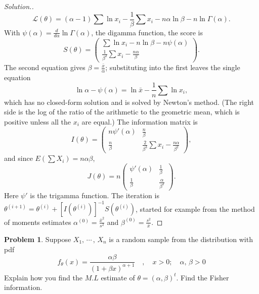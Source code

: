 \documentclass[12pt,a4paper]{report}
\theoremstyle{definition}
\newtheorem{problemx}{Problem}[section]
\newenvironment{problem}{\begin{problemx}}{\end{problemx}}
\newenvironment{solution}
  {\renewcommand{\qedsymbol}{}\begin{proof}[\textit{Solution}.]}
  {\end{proof}}
\begin{document}
\begin{solution}
\[\mathcal{L}(\theta) = (\alpha - 1)\sum\ln x_i - \frac1\beta\sum x_i - n\alpha\ln\beta - n\ln\Gamma(\alpha).\]
With $\psi(\alpha) = \frac{d}{d\alpha}\ln\Gamma(\alpha)$, the digamma function, the
score is
\[S(\theta) = \begin{pmatrix}
\sum\ln x_i - n\ln\beta - n\psi(\alpha)\\[1ex]
\frac{1}{\beta^2}\sum x_i - \frac{n\alpha}{\beta}
\end{pmatrix}.\]
The second equation gives $\beta = \frac{\bar x}{\alpha}$; substituting into the first
leaves the single equation
\[\ln\alpha - \psi(\alpha) = \ln\bar x - \frac1n\sum\ln x_i ,\]
which has no closed-form solution and is solved by Newton's method. (The right
side is the log of the ratio of the arithmetic to the geometric mean, which is
positive unless all the $x_i$ are equal.) The information matrix is
\[I(\theta) = \begin{pmatrix}
n\psi'(\alpha) & \frac n\beta\\[1ex]
\frac n\beta & \frac{2}{\beta^3}\sum x_i - \frac{n\alpha}{\beta^2}
\end{pmatrix},\]
and since $E\left(\sum X_i\right) = n\alpha\beta$,
\[J(\theta) = n\begin{pmatrix}
\psi'(\alpha) & \frac1\beta\\[1ex]
\frac1\beta & \frac{\alpha}{\beta^2}
\end{pmatrix}.\]
Here $\psi'$ is the trigamma function. The iteration is
$\theta^{(i+1)} = \theta^{(i)} + \left[I(\theta^{(i)})\right]^{-1}S(\theta^{(i)})$,
started for example from the method of moments estimates
$\alpha^{(0)} = \frac{\bar x^2}{s^2}$ and $\beta^{(0)} = \frac{s^2}{\bar x}$.
\end{solution}

\begin{problem}
\label{prob:lomaxmle}
Suppose $X_1, \, \cdots\, , \, X_n$ is a random sample from the distribution with pdf  \[f_{\theta}(x) = \frac{\alpha\beta}{\left(1 + \beta x\right)^{\alpha + 1}}\quad , \quad  x > 0;\quad  \alpha, \, \beta > 0\]
Explain how you find the $M.L$ estimate of $\theta = (\alpha, \beta)^t$. Find the Fisher information.
\end{problem}
\end{document}
